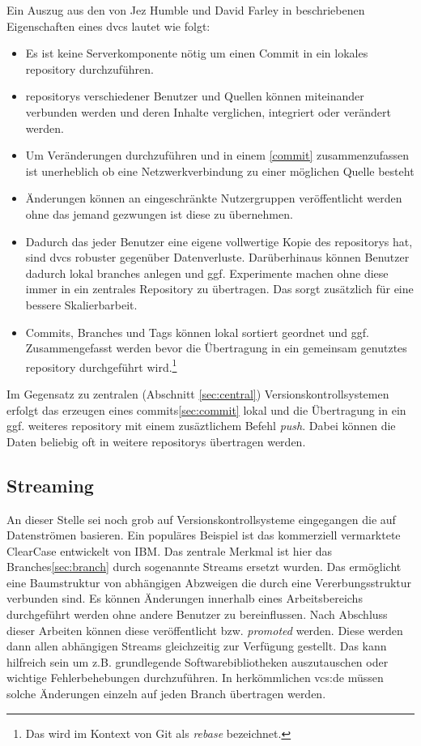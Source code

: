 Ein Auszug aus den von Jez Humble und David Farley in \cite[S.~393-394]{cd}
beschriebenen Eigenschaften eines \acrshort{dvcs} lautet wie folgt:

\begin{itemize}
\item Es ist keine Serverkomponente nötig um einen Commit in ein lokales
\gls{repository} durchzuführen.
\item \glspl{repository} verschiedener Benutzer und Quellen können miteinander
verbunden werden und deren Inhalte verglichen, integriert oder verändert werden. 
\item Um Veränderungen durchzuführen und in einem \ref{commit} zusammenzufassen
ist unerheblich ob eine Netzwerkverbindung zu einer möglichen Quelle besteht
\item Änderungen können an eingeschränkte Nutzergruppen veröffentlicht werden
ohne das jemand gezwungen ist diese zu übernehmen.
\item Dadurch das jeder Benutzer eine eigene vollwertige Kopie des
\glspl{repository} hat, sind \acrshort{dvcs} robuster gegenüber Datenverluste.
Darüberhinaus können Benutzer dadurch lokal branches anlegen und ggf.
Experimente machen ohne diese immer in ein zentrales Repository zu übertragen.
Das sorgt zusätzlich für eine bessere Skalierbarbeit.
\item Commits, Branches und Tags können lokal sortiert geordnet und ggf.
Zusammengefasst werden bevor die Übertragung in ein gemeinsam genutztes
\gls{repository} durchgeführt wird.\footnote{Das wird im Kontext von Git als
\textit{rebase} bezeichnet.}
\end{itemize}

Im Gegensatz zu zentralen (Abschnitt \ref{sec:central}) Versionskontrollsystemen erfolgt das
erzeugen eines \glspl{commit}\ref{sec:commit} lokal und die Übertragung in ein ggf.
weiteres \gls{repository} mit einem zusäztlichem Befehl \textit{push}. Dabei
können die Daten beliebig oft in weitere \glspl{repository} übertragen werden.

\subsection{Streaming}\label{sec:streaming}
An dieser Stelle sei noch grob auf Versionskontrollsysteme eingegangen die auf
Datenströmen basieren. Ein populäres Beispiel ist das kommerziell vermarktete
ClearCase entwickelt von IBM. Das zentrale Merkmal ist hier das
Branches\ref{sec:branch} durch sogenannte Streams ersetzt wurden.
Das ermöglicht eine Baumstruktur von abhängigen Abzweigen die durch eine
Vererbungsstruktur verbunden sind. Es können Änderungen innerhalb eines
Arbeitsbereichs durchgeführt werden ohne andere Benutzer zu bereinflussen. Nach
Abschluss dieser Arbeiten können diese veröffentlicht bzw. \textit{promoted}
werden. Diese werden dann allen abhängigen Streams gleichzeitig zur Verfügung
gestellt. Das kann hilfreich sein um z.B. grundlegende Softwarebibliotheken
auszutauschen oder wichtige Fehlerbehebungen durchzuführen. In herkömmlichen
\acrshort{vcs:de} müssen solche Änderungen einzeln auf jeden Branch übertragen
werden.
